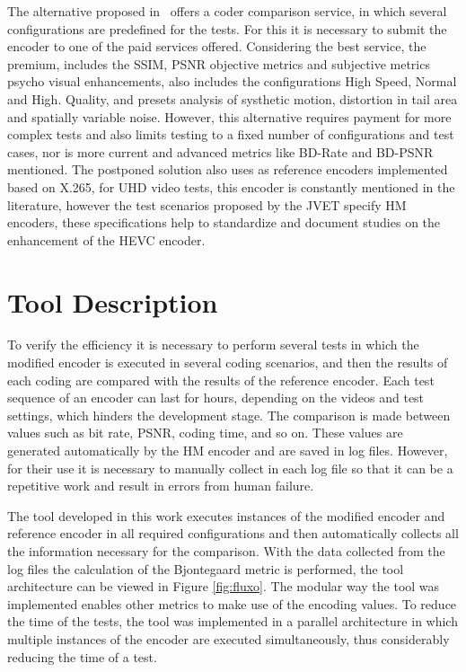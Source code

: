 \documentclass{acm_proc_article-sp}
\begin{document}
The alternative proposed in~\cite{msu:16} offers a coder comparison service, in which several configurations are predefined for the tests. For this it is necessary to submit the encoder to one of the paid services offered. Considering the best service, the premium, includes the SSIM, PSNR objective metrics and subjective metrics psycho visual enhancements, also includes the configurations High Speed, Normal and High. Quality, and presets analysis of systhetic motion, distortion in tail area and spatially variable noise. However, this alternative requires payment for more complex tests and also limits testing to a fixed number of configurations and test cases, nor is more current and advanced metrics like BD-Rate and BD-PSNR mentioned. The postponed solution also uses as reference encoders implemented based on X.265, for UHD video tests, this encoder is constantly mentioned in the literature, however the test scenarios proposed by the JVET specify HM encoders, these specifications help to standardize and document studies on the enhancement of the HEVC encoder.


\section{Tool Description}

To verify the efficiency it is necessary to perform several tests in which the modified encoder is executed in several coding scenarios, and then the results of each coding are compared with the results of the reference encoder. Each test sequence of an encoder can last for hours, depending on the videos and test settings, which hinders the development stage. The comparison is made between values such as bit rate, PSNR, coding time, and so on. These values are generated automatically by the HM encoder and are saved in log files. However, for their use it is necessary to manually collect in each log file so that it can be a repetitive work and result in errors from human failure. 

The tool developed in this work executes instances of the modified encoder and reference encoder in all required configurations and then automatically collects all the information necessary for the comparison. With the data collected from the log files the calculation of 
the Bjontegaard \cite{Bjontegaard} metric is performed, the tool architecture can be viewed in Figure \ref{fig:fluxo}. The modular way the tool was implemented enables other metrics to make use of the encoding values. To reduce the time of the tests, the tool was implemented in a parallel architecture in which multiple instances of the encoder are executed simultaneously, thus considerably reducing the time of a test.
\end{document}
